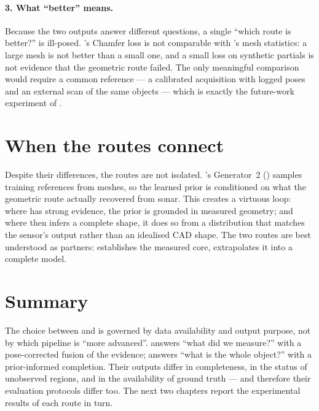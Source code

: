 \paragraph{3. What ``better'' means.}
Because the two outputs answer different questions, a single ``which route is
better?'' is ill-posed. \routeB{}'s Chamfer loss is not comparable with
\routeA{}'s mesh statistics: a large \routeA{} mesh is not better than a small
one, and a small \routeB{} loss on synthetic partials is not evidence that the
geometric route failed. The only meaningful comparison would require a common
reference --- a calibrated acquisition with logged poses and an external scan
of the same objects --- which is exactly the future-work experiment of
.

\section{When the routes connect}
\label{sec:cmp_connection}

Despite their differences, the routes are not isolated. \routeB{}'s
Generator~2 () samples training references from
\routeA{} meshes, so the learned prior is conditioned on what the geometric
route actually recovered from sonar. This creates a virtuous loop: where
\routeA{} has strong evidence, the prior is grounded in measured geometry; and
where \routeB{} then infers a complete shape, it does so from a distribution
that matches the sensor's output rather than an idealised CAD shape. The two
routes are best understood as partners: \routeA{} establishes the measured
core, \routeB{} extrapolates it into a complete model.

\section{Summary}
\label{sec:cmp_summary}

The choice between \routeA{} and \routeB{} is governed by data availability and
output purpose, not by which pipeline is ``more advanced''. \routeA{} answers
``what did we measure?'' with a pose-corrected fusion of the evidence;
\routeB{} answers ``what is the whole object?'' with a prior-informed
completion. Their outputs differ in completeness, in the status of unobserved
regions, and in the availability of ground truth --- and therefore their
evaluation protocols differ too. The next two chapters report the experimental
results of each route in turn.
